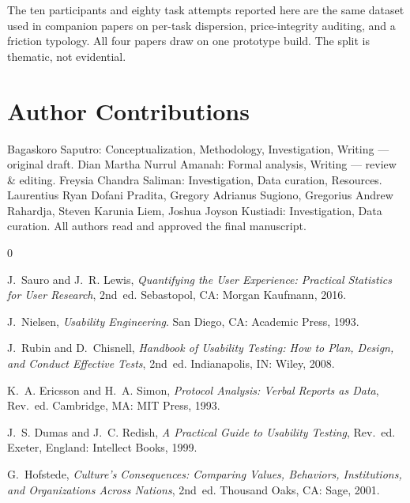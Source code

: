 \documentclass[conference]{IEEEtran}
\begin{document}
The ten participants and eighty task attempts reported here are the same dataset used in companion
papers on per-task dispersion, price-integrity auditing, and a friction typology. All four papers draw
on one prototype build. The split is thematic, not evidential.

\section*{Author Contributions}

Bagaskoro Saputro: Conceptualization, Methodology, Investigation, Writing --- original draft. Dian
Martha Nurrul Amanah: Formal analysis, Writing --- review \& editing. Freysia Chandra Saliman:
Investigation, Data curation, Resources. Laurentius Ryan Dofani Pradita, Gregory Adrianus Sugiono,
Gregorius Andrew Rahardja, Steven Karunia Liem, Joshua Joyson Kustiadi: Investigation, Data curation.
All authors read and approved the final manuscript.

\begin{thebibliography}{0}

J.~Sauro and J.~R. Lewis, \emph{Quantifying the User Experience: Practical Statistics for User
Research}, 2nd~ed. Sebastopol, CA: Morgan Kaufmann, 2016.

J.~Nielsen, \emph{Usability Engineering}. San Diego, CA: Academic Press, 1993.

J.~Rubin and D.~Chisnell, \emph{Handbook of Usability Testing: How to Plan, Design, and Conduct
Effective Tests}, 2nd~ed. Indianapolis, IN: Wiley, 2008.

K.~A. Ericsson and H.~A. Simon, \emph{Protocol Analysis: Verbal Reports as Data}, Rev.~ed.
Cambridge, MA: MIT Press, 1993.

J.~S. Dumas and J.~C. Redish, \emph{A Practical Guide to Usability Testing}, Rev.~ed. Exeter,
England: Intellect Books, 1999.

G.~Hofstede, \emph{Culture's Consequences: Comparing Values, Behaviors, Institutions, and
Organizations Across Nations}, 2nd~ed. Thousand Oaks, CA: Sage, 2001.

\end{thebibliography}
\end{document}
